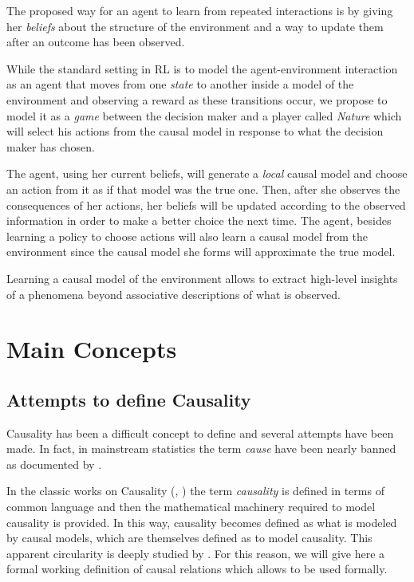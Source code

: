 \documentclass[11pt]{article}
\theoremstyle{plain}
\begin{document}
The proposed way for an agent to learn from repeated interactions is by giving her \textit{beliefs} about the structure of the environment and a way to update them after an outcome has been observed.

While the standard setting in RL is to model the agent-environment interaction as an agent that moves from one \textit{state} to another inside a model of the environment and observing a reward as these transitions occur, we propose to model it as a \textit{game} between the decision maker and a player called \textit{Nature} which will select his actions from the causal model in response to what the decision maker has chosen. 

The agent, using her current beliefs, will generate a \textit{local} causal model and choose an action from it as if that model was the true one. Then, after she observes the consequences of her actions, her beliefs will be updated according to the observed information in order to make a better choice the next time. The agent, besides learning a policy to choose actions will also learn a causal model from the environment since the causal model she forms will approximate the true model.

Learning a causal model of the environment allows to extract high-level insights of a phenomena beyond associative descriptions of what is observed.

\section{Main Concepts}
	\subsection{Attempts to define Causality}
	Causality has been a difficult concept to define and several attempts have been made. In fact, in mainstream statistics  the term \textit{cause} have been nearly banned as documented by \cite{pearl2018why}.
	
	In the classic works on Causality (\cite{spirtes2000causation}, \cite{pearl2009causality}) the term \textit{causality} is defined in terms of common language and then the mathematical machinery required to model causality is provided. In this way, causality becomes defined as what is modeled by causal models, which are themselves defined as to model causality. This apparent circularity is deeply studied by \cite{woodward2005making}. For this reason, we will give here a formal working definition of causal relations which allows to be used formally.
\end{document}
